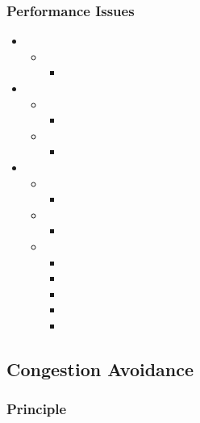 \documentclass[a4paper]{article}
\begin{document}
\subsubsection{Performance Issues}
\begin{itemize}
	\item
	\begin{itemize}
		\item
		\begin{itemize}
			\item
		\end{itemize}
	\end{itemize}
	\item
	\begin{itemize}
		\item
		\begin{itemize}
			\item
		\end{itemize}
		\item
		\begin{itemize}
			\item
		\end{itemize}
	\end{itemize}
	\item
	\begin{itemize}
		\item
		\begin{itemize}
			\item
		\end{itemize}
		\item
		\begin{itemize}
			\item
		\end{itemize}
		\item
		\begin{itemize}
			\item
			\item
			\item
			\item
			\item
		\end{itemize}
	\end{itemize}
\end{itemize}
\subsection{Congestion Avoidance}
\subsubsection{Principle}
\end{document}
